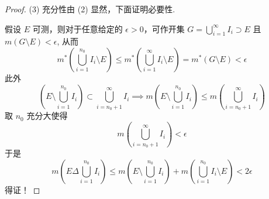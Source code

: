 \begin{proof}
(3) 充分性由 (2) 显然，下面证明必要性.

假设 $E$ 可测，则对于任意给定的 $\epsilon>0$，可作开集 $G=\bigcup_{i=1}^{\infty}I_i\supset E$ 且 $m(G\setminus E)<\epsilon$, 从而
\[
m^{*}\left( \bigcup_{i=1}^{n_0} I_i\setminus E \right)\leq m^{*}\left( \bigcup_{i=1}^{\infty} I_i\setminus E \right)=m^{*}(G\setminus E)<\epsilon
\]
此外
\[
\left( E\setminus \bigcup_{i=1}^{n_0} I_i \right)\subset \bigcup_{i=n_0+1}^{\infty} I_i\implies m\left( E\setminus \bigcup_{i=1}^{n_0} I_i \right)\leq  m\left( \bigcup_{i=n_0+1}^{\infty} I_i \right)
\]
取 $n_0$ 充分大使得
\[
m\left( \bigcup_{i=n_0+1}^{\infty} I_i \right)<\epsilon
\]
于是
\[
m\left( E\Delta \bigcup_{i=1}^{n_0} I_i \right)\leq m\left( E\setminus \bigcup_{i=1}^{n_0} I_i \right)+m\left( \bigcup_{i=1}^{n_0} I_i\setminus E \right)<2\epsilon
\]
得证！
\end{proof}

